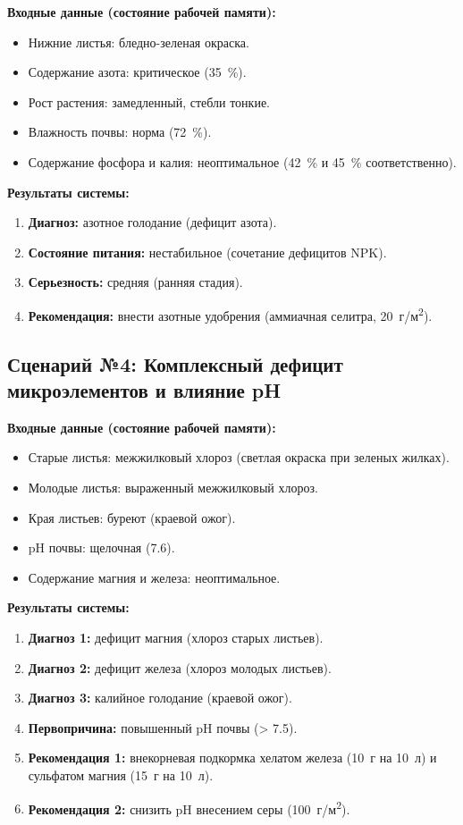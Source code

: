 \textbf{Входные данные (состояние рабочей памяти):}
\begin{itemize}
    \item Нижние листья: бледно-зеленая окраска.
    \item Содержание азота: критическое (\SI{35}{\%}).
    \item Рост растения: замедленный, стебли тонкие.
    \item Влажность почвы: норма (\SI{72}{\%}).
    \item Содержание фосфора и калия: неоптимальное (\SI{42}{\%} и \SI{45}{\%} соответственно).
\end{itemize}

\textbf{Результаты системы:}
\begin{enumerate}
    \item \textbf{Диагноз:} азотное голодание (дефицит азота).
    \item \textbf{Состояние питания:} нестабильное (сочетание дефицитов NPK).
    \item \textbf{Серьезность:} средняя (ранняя стадия).
    \item \textbf{Рекомендация:} внести азотные удобрения (аммиачная селитра, \SI{20}{г/м^2}).
\end{enumerate}


\subsection{Сценарий №4: Комплексный дефицит микроэлементов и влияние pH}

\textbf{Входные данные (состояние рабочей памяти):}
\begin{itemize}
    \item Старые листья: межжилковый хлороз (светлая окраска при зеленых жилках).
    \item Молодые листья: выраженный межжилковый хлороз.
    \item Края листьев: буреют (краевой ожог).
    \item pH почвы: щелочная (\num{7.6}).
    \item Содержание магния и железа: неоптимальное.
\end{itemize}

\textbf{Результаты системы:}
\begin{enumerate}
    \item \textbf{Диагноз 1:} дефицит магния (хлороз старых листьев).
    \item \textbf{Диагноз 2:} дефицит железа (хлороз молодых листьев).
    \item \textbf{Диагноз 3:} калийное голодание (краевой ожог).
    \item \textbf{Первопричина:} повышенный pH почвы (\num{> 7.5}).
    \item \textbf{Рекомендация 1:} внекорневая подкормка хелатом железа (\SI{10}{г} на \SI{10}{л}) и сульфатом магния (\SI{15}{г} на \SI{10}{л}).
    \item \textbf{Рекомендация 2:} снизить pH внесением серы (\SI{100}{г/м^2}).
\end{enumerate}

